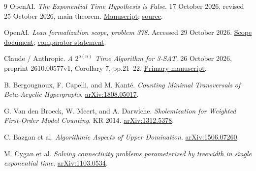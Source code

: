\documentclass[11pt]{article}
\theoremstyle{remark}\newtheorem{remark}[theorem]{Remark}
\begin{document}
\begin{thebibliography}{9}
 OpenAI.
\emph{The Exponential Time Hypothesis is False}.
17 October 2026, revised 25 October 2026, main theorem.
\href{https://github.com/openai/math/blob/main/preprints/The-Exponential-Time-Hypothesis-is-False-October-25-2026/paper.pdf}{Manuscript};
\href{https://raw.githubusercontent.com/openai/math/refs/heads/main/preprints/The-Exponential-Time-Hypothesis-is-False-October-25-2026/build/main_full_version.tex}{source}.

 OpenAI.
\emph{Lean formalization scope, problem 378}.
Accessed 29 October 2026.
\href{https://github.com/openai/math/blob/main/lean/docs/378.md}{Scope document};
\href{https://github.com/openai/math/blob/main/lean/ComparatorChallenges/SubexponentialSAT.lean}{comparator statement}.

 Claude / Anthropic.
\emph{A $2^{o(n)}$ Time Algorithm for 3-SAT}.
26 October 2026, preprint 2610.00577v1, Corollary 7, pp.21--22.
\href{https://hexagonmath.org/pdf/2610.00577v1}{Primary manuscript}.

 B. Bergougnoux, F. Capelli, and M. Kant\'e.
\emph{Counting Minimal Transversals of Beta-Acyclic Hypergraphs}.
\href{https://arxiv.org/abs/1808.05017}{arXiv:1808.05017}.

 G. Van den Broeck, W. Meert, and A. Darwiche.
\emph{Skolemization for Weighted First-Order Model Counting}.
KR 2014.
\href{https://arxiv.org/abs/1312.5378}{arXiv:1312.5378}.

 C. Bazgan et al.
\emph{Algorithmic Aspects of Upper Domination}.
\href{https://arxiv.org/abs/1506.07260}{arXiv:1506.07260}.

 M. Cygan et al.
\emph{Solving connectivity problems parameterized by treewidth in single
exponential time}.
\href{https://arxiv.org/abs/1103.0534}{arXiv:1103.0534}.
\end{thebibliography}
\end{document}
